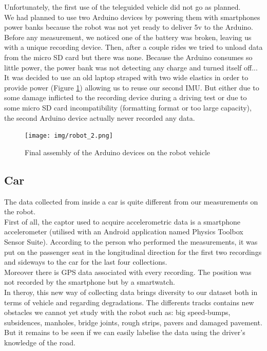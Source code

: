 Unfortunately, the first use of the teleguided vehicle did not go as planned.\\
We had planned to use two Arduino devices by powering them with smartphones power banks because the robot was not yet ready to deliver 5v to the Arduino. Before any measurement, we noticed one of the battery was broken, leaving us with a unique recording device. Then, after a couple rides we tried to unload data from the micro SD card but there was none. Because the Arduino consumes so little power, the power bank was not detecting any charge and turned itself off... It was decided to use an old laptop straped with two wide elastics in order to provide power (Figure \ref{robot_2}) allowing us to reuse our second IMU. But either due to some damage inflicted to the recording device during a driving test or due to some micro SD card incompatibility (formatting format or too large capacity), the second Arduino device actually never recorded any data.

\begin{figure}
    \center
    \texttt{[image: img/robot\_2.png]}
    \caption{Final assembly of the Arduino devices on the robot vehicle}
    \label{robot_2}
\end{figure}

\subsection{Car}
The data collected from inside a car is quite different from our measurements on the robot.\\

First of all, the captor used to acquire accelerometric data is a smartphone accelerometer (utilised with an Android application named Physics Toolbox Sensor Suite). According to the person who performed the measurements, it was put on the passenger seat in the longitudinal direction for the first two recordings and sideways to the car for the last four collections.\\

Moreover there is GPS data associated with every recording. The position was not recorded by the smartphone but by a smartwatch.\\

In theroy, this new way of collecting data brings diversity to our dataset both in terms of vehicle and regarding degradations. The differents tracks contains new obstacles we cannot yet study with the robot such as: big speed-bumps, subsidences, manholes, bridge joints, rough strips, pavers and damaged pavement. But it remains to be seen if we can easily labelise the data using the driver's knowledge of the road.\\

